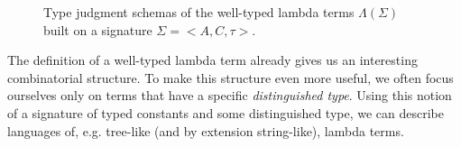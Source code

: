 \begin{figure}
  \begin{prooftree}
  \end{prooftree}
  \begin{prooftree}
  \end{prooftree}
  \begin{prooftree}
  \end{prooftree}
  \begin{prooftree}
  \end{prooftree}
  \begin{prooftree}
  \end{prooftree}
  \begin{prooftree}
  \end{prooftree}
  \begin{prooftree}
  \end{prooftree}
  \caption{\label{fig:type-judgments} Type judgment schemas of the
    well-typed lambda terms $\Lambda(\Sigma)$ built on a signature
    $\Sigma = \mathopen{<}A, C, \tau\mathclose{>}$.}
\end{figure}

The definition of a well-typed lambda term already gives us an
interesting combinatorial structure. To make this structure even more
useful, we often focus ourselves only on terms that have a specific
\emph{distinguished type}. Using this notion of a signature of typed
constants and some distinguished type, we can describe languages of,
e.g. tree-like (and by extension string-like), lambda terms.

